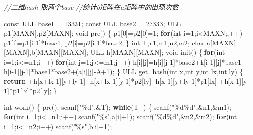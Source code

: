 \documentclass[
]{article}
\newenvironment{Shaded}{}{}
\newcommand{\AttributeTok}[1]{\textcolor[rgb]{0.49,0.56,0.16}{#1}}
\newcommand{\CharTok}[1]{\textcolor[rgb]{0.25,0.44,0.63}{#1}}
\newcommand{\CommentTok}[1]{\textcolor[rgb]{0.38,0.63,0.69}{\textit{#1}}}
\newcommand{\ControlFlowTok}[1]{\textcolor[rgb]{0.00,0.44,0.13}{\textbf{#1}}}
\newcommand{\DataTypeTok}[1]{\textcolor[rgb]{0.56,0.13,0.00}{#1}}
\newcommand{\DecValTok}[1]{\textcolor[rgb]{0.25,0.63,0.44}{#1}}
\newcommand{\NormalTok}[1]{#1}
\newcommand{\SpecialCharTok}[1]{\textcolor[rgb]{0.25,0.44,0.63}{#1}}
\newcommand{\StringTok}[1]{\textcolor[rgb]{0.25,0.44,0.63}{#1}}
\begin{document}
\begin{Shaded}
\begin{Highlighting}[]
\CommentTok{//二维hash 取两个base}
\CommentTok{//统计b矩阵在a矩阵中的出现次数}

\AttributeTok{const}\NormalTok{ ULL base1 = }\DecValTok{13331}\NormalTok{;}
\AttributeTok{const}\NormalTok{ ULL base2 = }\DecValTok{23333}\NormalTok{;}
\NormalTok{ULL p1[MAXN],p2[MAXN];}
\DataTypeTok{void}\NormalTok{ pre()}
\NormalTok{\{}
\NormalTok{    p1[}\DecValTok{0}\NormalTok{]=p2[}\DecValTok{0}\NormalTok{]=}\DecValTok{1}\NormalTok{;}
    \ControlFlowTok{for}\NormalTok{(}\DataTypeTok{int}\NormalTok{ i=}\DecValTok{1}\NormalTok{;i\textless{}MAXN;i++)}
\NormalTok{        p1[i]=p1[i{-}}\DecValTok{1}\NormalTok{]*base1,}
\NormalTok{        p2[i]=p2[i{-}}\DecValTok{1}\NormalTok{]*base2;}
\NormalTok{\}}
\DataTypeTok{int}\NormalTok{ T,n1,m1,n2,m2;}
\DataTypeTok{char}\NormalTok{ a[MAXN][MAXN],b[MAXN][MAXN];}
\NormalTok{ULL h[MAXN][MAXN];}
\DataTypeTok{void}\NormalTok{ init()}
\NormalTok{\{}
    \ControlFlowTok{for}\NormalTok{(}\DataTypeTok{int}\NormalTok{ i=}\DecValTok{1}\NormalTok{;i\textless{}=n1;i++)}
        \ControlFlowTok{for}\NormalTok{(}\DataTypeTok{int}\NormalTok{ j=}\DecValTok{1}\NormalTok{;j\textless{}=m1;j++)}
\NormalTok{            h[i][j]=h[i][j{-}}\DecValTok{1}\NormalTok{]*base2+h[i{-}}\DecValTok{1}\NormalTok{][j]*base1}
\NormalTok{                {-}h[i{-}}\DecValTok{1}\NormalTok{][j{-}}\DecValTok{1}\NormalTok{]*base1*base2+(a[i][j]{-}}\CharTok{\textquotesingle{}A\textquotesingle{}}\NormalTok{+}\DecValTok{1}\NormalTok{);}
\NormalTok{\}}
\NormalTok{ULL get\_hash(}\DataTypeTok{int}\NormalTok{ x,}\DataTypeTok{int}\NormalTok{ y,}\DataTypeTok{int}\NormalTok{ lx,}\DataTypeTok{int}\NormalTok{ ly)}
\NormalTok{\{}
    \ControlFlowTok{return}\NormalTok{  +h[x+lx{-}}\DecValTok{1}\NormalTok{][y+ly{-}}\DecValTok{1}\NormalTok{]}
\NormalTok{            {-}h[x+lx{-}}\DecValTok{1}\NormalTok{][y{-}}\DecValTok{1}\NormalTok{]*p2[ly]}
\NormalTok{            {-}h[x{-}}\DecValTok{1}\NormalTok{][y+ly{-}}\DecValTok{1}\NormalTok{]*p1[lx]}
\NormalTok{            +h[x{-}}\DecValTok{1}\NormalTok{][y{-}}\DecValTok{1}\NormalTok{]*p1[lx]*p2[ly];}
\NormalTok{\}}

\DataTypeTok{int}\NormalTok{ work()}
\NormalTok{\{}
\NormalTok{    pre();}
\NormalTok{    scanf(}\StringTok{"}\SpecialCharTok{\%d}\StringTok{"}\NormalTok{,\&T);}
    \ControlFlowTok{while}\NormalTok{(T{-}{-})}
\NormalTok{    \{}
\NormalTok{        scanf(}\StringTok{"}\SpecialCharTok{\%d\%d}\StringTok{"}\NormalTok{,\&n1,\&m1);}
        \ControlFlowTok{for}\NormalTok{(}\DataTypeTok{int}\NormalTok{ i=}\DecValTok{1}\NormalTok{;i\textless{}=n1;i++) scanf(}\StringTok{"}\SpecialCharTok{\%s}\StringTok{"}\NormalTok{,a[i]+}\DecValTok{1}\NormalTok{);}
\NormalTok{        scanf(}\StringTok{"}\SpecialCharTok{\%d\%d}\StringTok{"}\NormalTok{,\&n2,\&m2);}
        \ControlFlowTok{for}\NormalTok{(}\DataTypeTok{int}\NormalTok{ i=}\DecValTok{1}\NormalTok{;i\textless{}=n2;i++) scanf(}\StringTok{"}\SpecialCharTok{\%s}\StringTok{"}\NormalTok{,b[i]+}\DecValTok{1}\NormalTok{);}


\end{Highlighting}
\end{Shaded}
\end{document}
